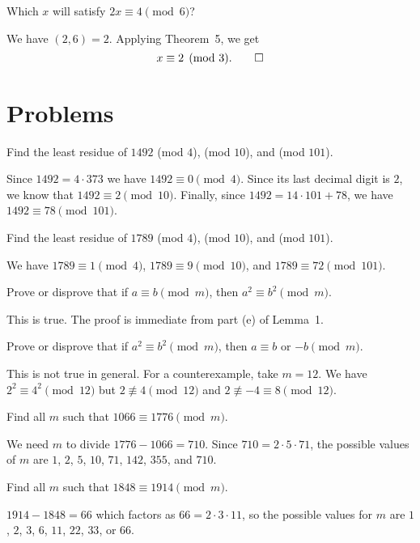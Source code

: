  Which $x$ will satisfy $2x\equiv4\pmod6$?
\begin{solution}
  We have $(2,6) = 2$. Applying Theorem~5, we get
  \begin{equation*}
    x\equiv2\pmod3. \qedhere
  \end{equation*}
\end{solution}

\section{Problems}

 Find the least residue of $1492$ (mod $4$), (mod $10$), and
(mod $101$).
\begin{solution}
  Since $1492 = 4\cdot373$ we have $1492\equiv0\pmod4$. Since its last
  decimal digit is $2$, we know that $1492\equiv2\pmod{10}$. Finally,
  since $1492 = 14\cdot101 + 78$, we have $1492\equiv78\pmod{101}$.
\end{solution}

 Find the least residue of $1789$ (mod $4$), (mod $10$), and
(mod $101$).
\begin{solution}
  We have $1789\equiv1\pmod4$, $1789\equiv9\pmod{10}$, and
  $1789\equiv72\pmod{101}$.
\end{solution}

 Prove or disprove that if $a\equiv b\pmod m$, then
$a^2\equiv b^2\pmod m$.
\begin{solution}
  This is true. The proof is immediate from part (e) of Lemma~1.
\end{solution}

 Prove or disprove that if $a^2\equiv b^2\pmod m$, then
$a\equiv b$ or $-b\pmod m$.
\begin{solution}
  This is not true in general. For a counterexample, take $m = 12$. We
  have $2^2\equiv4^2\pmod{12}$ but $2\not\equiv4\pmod{12}$ and
  $2\not\equiv-4\equiv8\pmod{12}$.
\end{solution}

 Find all $m$ such that $1066\equiv1776\pmod{m}$.
\begin{solution}
  We need $m$ to divide $1776 - 1066 = 710$. Since
  $710 = 2\cdot5\cdot71$, the possible values of $m$ are $1$, $2$,
  $5$, $10$, $71$, $142$, $355$, and $710$.
\end{solution}

 Find all $m$ such that $1848\equiv1914\pmod{m}$.
\begin{solution}
  $1914 - 1848 = 66$ which factors as $66 = 2\cdot3\cdot11$, so the
  possible values for $m$ are $1$, $2$, $3$, $6$, $11$, $22$, $33$, or
  $66$.
\end{solution}
